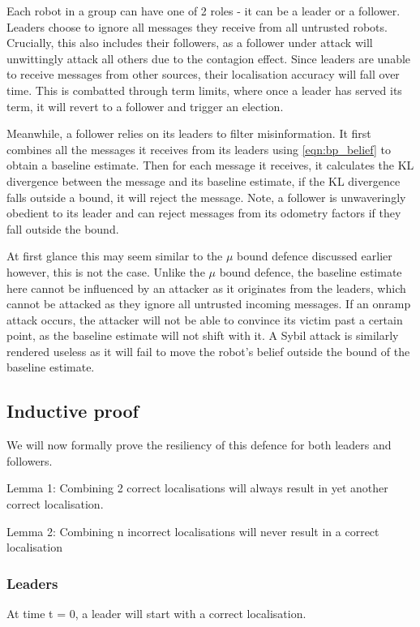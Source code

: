 Each robot in a group can have one of 2 roles - it can be a leader or a follower. Leaders choose to ignore all messages they receive from all untrusted robots. Crucially, this also includes their followers, as a follower under attack will unwittingly attack all others due to the contagion effect. Since leaders are unable to receive messages from other sources, their localisation accuracy will fall over time. This is combatted through term limits, where once a leader has served its term, it will revert to a follower and trigger an election.

Meanwhile, a follower relies on its leaders to filter misinformation. It first combines all the messages it receives from its leaders using \ref{eqn:bp_belief} to obtain a baseline estimate. Then for each message it receives, it calculates the KL divergence between the message and its baseline estimate, if the KL divergence falls outside a bound, it will reject the message. Note, a follower is unwaveringly obedient to its leader and can reject messages from its odometry factors if they fall outside the bound. 


At first glance this may seem similar to the $\mu$ bound defence discussed earlier however, this is not the case. Unlike the $\mu$ bound defence, the baseline estimate here cannot be influenced by an attacker as it originates from the leaders, which cannot be attacked as they ignore all untrusted incoming messages. If an onramp attack occurs, the attacker will not be able to convince its victim past a certain point, as the baseline estimate will not shift with it. A Sybil attack is similarly rendered useless as it will fail to move the robot's belief outside the bound of the baseline estimate.

\subsection{Inductive proof}
We will now formally prove the resiliency of this defence for both leaders and followers.

Lemma 1: Combining 2 correct localisations will always result in yet another correct localisation.

Lemma 2: Combining n incorrect localisations will never result in a correct localisation

\subsubsection{Leaders}
At time t = 0, a leader will start with a correct localisation.

